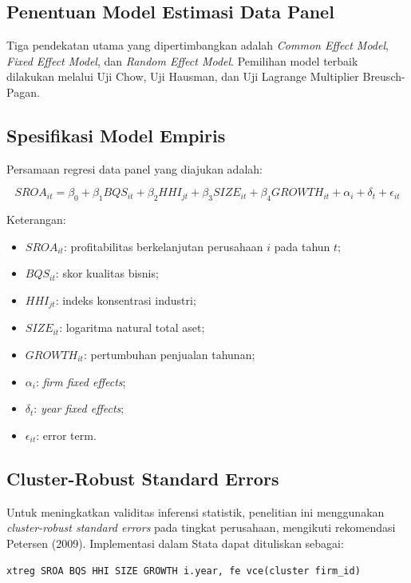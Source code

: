 \documentclass[12pt,a4paper]{report}
\begin{document}
\subsection{Penentuan Model Estimasi Data Panel}

Tiga pendekatan utama yang dipertimbangkan adalah \textit{Common Effect Model}, \textit{Fixed Effect Model}, dan \textit{Random Effect Model}. Pemilihan model terbaik dilakukan melalui Uji Chow, Uji Hausman, dan Uji Lagrange Multiplier Breusch-Pagan.

\subsection{Spesifikasi Model Empiris}

Persamaan regresi data panel yang diajukan adalah:

\[
SROA_{it} = \beta_0 + \beta_1 BQS_{it} + \beta_2 HHI_{jt} + \beta_3 SIZE_{it} + \beta_4 GROWTH_{it} + \alpha_i + \delta_t + \epsilon_{it}
\]

Keterangan:

\begin{itemize}
    \item $SROA_{it}$: profitabilitas berkelanjutan perusahaan $i$ pada tahun $t$;
    \item $BQS_{it}$: skor kualitas bisnis;
    \item $HHI_{jt}$: indeks konsentrasi industri;
    \item $SIZE_{it}$: logaritma natural total aset;
    \item $GROWTH_{it}$: pertumbuhan penjualan tahunan;
    \item $\alpha_i$: \textit{firm fixed effects};
    \item $\delta_t$: \textit{year fixed effects};
    \item $\epsilon_{it}$: error term.
\end{itemize}

\subsection{Cluster-Robust Standard Errors}

Untuk meningkatkan validitas inferensi statistik, penelitian ini menggunakan \textit{cluster-robust standard errors} pada tingkat perusahaan, mengikuti rekomendasi Petersen (2009). Implementasi dalam Stata dapat dituliskan sebagai:

\texttt{xtreg SROA BQS HHI SIZE GROWTH i.year, fe vce(cluster firm\_id)}
\end{document}
